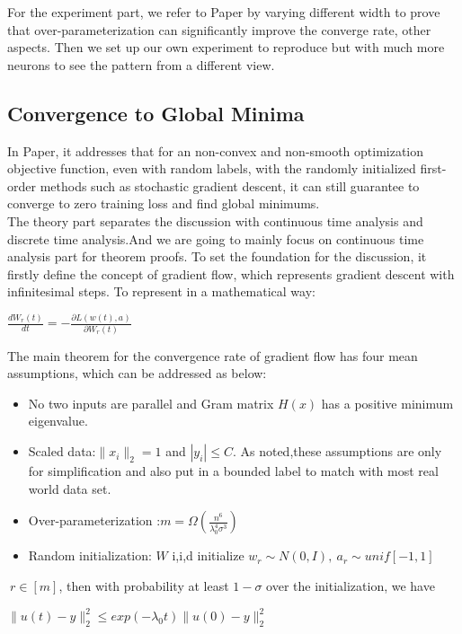 \documentclass{article}
\begin{document}
For the experiment part, we refer to Paper  \cite{SimonDu} by varying different width to prove that over-parameterization can significantly improve the converge rate, other aspects. Then we set up our own experiment to reproduce but with much more neurons to see the pattern from a different view. 

\subsection{Convergence to Global Minima}
In Paper\cite{SimonDu}, it addresses that for an non-convex and non-smooth optimization objective function, even with random labels, with the randomly initialized first-order methods such as stochastic gradient descent, it can still guarantee to converge to zero training loss and find global minimums.\\

The theory part separates the discussion with continuous time analysis and discrete time analysis.And we are going to mainly focus on continuous time analysis part for theorem proofs. To set the foundation for the discussion, it firstly define the concept of gradient flow, which represents gradient descent with infinitesimal steps. To represent in a mathematical way:
\begin{center}
    $\frac{d W_r(t)}{dt} = -\frac{\partial L(w(t),a)}{\partial W_r(t)}$
\end{center}

The main theorem for the convergence rate of gradient flow has four mean assumptions, which can be addressed as below:
\begin{itemize}
\item No two inputs are parallel and Gram matrix $H(x)$ has a positive minimum eigenvalue.
\item Scaled data:$\|x_i\|_{2} = 1$ and $|y_i|\leq C$. As noted,these assumptions are only for simplification and also put in a bounded label to match with most real world data set.  
\item Over-parameterization :$m=\Omega(\frac{n^6}{\lambda^4_0 \sigma^3})$
\item Random initialization: $W$ i,i,d initialize $w_r\sim N(0,I),\ a_r \sim unif[{-1,1}]$
\end{itemize}

$\ r\in [m]$, then with probability at least $1-\sigma$ over the initialization, we have 
\begin{center}
    $\|u(t)-y\|^2_2 \leq exp(-\lambda_0 t)\|u(0)-y\|^2_2$
\end{center}
\end{document}
